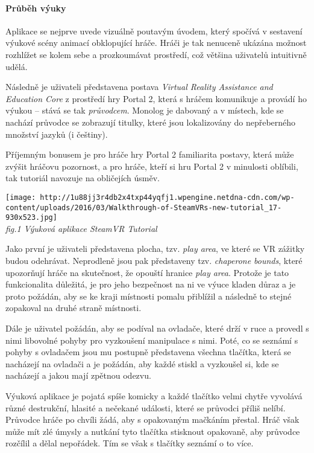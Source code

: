 \paragraph{Průběh výuky}\label{prux16fbux11bh-vuxfduky}

Aplikace se nejprve uvede vizuálně poutavým úvodem, který spočívá v
sestavení výukové scény animací obklopující hráče. Hráči je tak nenuceně
ukázána možnost rozhlížet se kolem sebe a prozkoumávat prostředí, což
většina uživatelů intuitivně udělá.

Následně je uživateli představena postava \emph{Virtual Reality
Assistance and Education Core} z prostředí hry Portal 2, která s hráčem
komunikuje a provádí ho výukou -- stává se tak \emph{průvodcem}. Monolog
je dabovaný a v místech, kde se nachází průvodce se zobrazují titulky,
které jsou lokalizovány do nepřeberného množství jazyků (i češtiny).

Příjemným bonusem je pro hráče hry Portal 2 familiarita postavy, která
může zvýšit hráčovu pozornost, a pro hráče, kteří si hru Portal 2 v
minulosti oblíbili, tak tutoriál navozuje na obličejích úsměv.

\texttt{[image: http://1u88jj3r4db2x4txp44yqfj1.wpengine.netdna-cdn.com/wp-content/uploads/2016/03/Walkthrough-of-SteamVRs-new-tutorial\_17-930x523.jpg]}\\
\emph{fig.1 Výuková aplikace SteamVR Tutorial}

Jako první je uživateli představena plocha, tzv. \emph{play area}, ve
které se VR zážitky budou odehrávat. Neprodleně jsou pak představeny
tzv. \emph{chaperone bounds}, které upozorňují hráče na skutečnost, že
opouští hranice \emph{play area}. Protože je tato funkcionalita
důležitá, je pro jeho bezpečnost na ni ve výuce kladen důraz a je proto
požádán, aby se ke kraji místnosti pomalu přiblížil a následně to stejné
zopakoval na druhé straně místnosti.

Dále je uživatel požádán, aby se podíval na ovladače, které drží v ruce
a provedl s nimi libovolné pohyby pro vyzkoušení manipulace s nimi.
Poté, co se seznámí s pohyby s ovladačem jsou mu postupně představena
všechna tlačítka, která se nacházejí na ovladači a je požádán, aby každé
stiskl a vyzkoušel si, kde se nacházejí a jakou mají zpětnou odezvu.

Výuková aplikace je pojatá spíše komicky a každé tlačítko velmi chytře
vyvolává různé destrukční, hlasité a nečekané události, které se
průvodci příliš nelíbí. Průvodce hráče po chvíli žádá, aby s opakovaným
mačkáním přestal. Hráč však může mít zlé úmysly a nutkání tyto tlačítka
stisknout opakovaně, aby průvodce rozčílil a dělal nepořádek. Tím se
však s tlačítky seznámí o to více.

